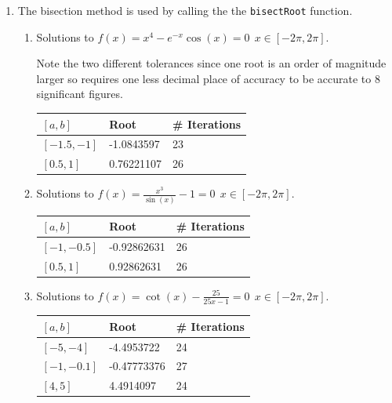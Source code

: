 \documentclass[a4paper,11pt]{article}
\begin{document}
\begin{enumerate}
	\item The bisection method is used by calling the the \verb*|bisectRoot| 
	function.
	
	
	
	\begin{enumerate}
		\item Solutions to $f(x) = x^{4} - e^{-x} \cos(x) = 0 \  \ 
		x\in[-2\pi,2\pi]$.
		
		Note the two different tolerances since one root is an order of 
		magnitude larger so requires one less decimal place of accuracy to be 
		accurate to 8 significant figures.
		\begin{center}
			\begin{tabular}{l|ll}
				$[a,b]$     & Root       & \# Iterations \\ \hline
				$[-1.5,-1]$ & -1.0843597 & 23           \\
				$[0.5,1]$   & 0.76221107 & 26          
			\end{tabular}
		\end{center}
		
	
	
		\item Solutions to $f(x) = \frac{x^{3}}{\sin(x)} - 1 = 0 \  \ 
		x\in[-2\pi,2\pi]$.
		
		\begin{center}
			\begin{tabular}{l|ll}
				$[a,b]$     & Root        & \# Iterations \\ \hline
				$[-1,-0.5]$ & -0.92862631 & 26            \\
				$[0.5,1]$   & 0.92862631  & 26           
			\end{tabular}
		\end{center}
	
	
		\item Solutions to $f(x) = \cot(x)	- \frac{25}{25x-1} = 0 \  \ 
		x\in[-2\pi,2\pi]$.
		
		\begin{center}
			\begin{tabular}{l|ll}
				$[a,b]$     & Root        & \# Iterations \\ \hline
				$[-5,-4]$   & -4.4953722  & 24            \\
				$[-1,-0.1]$ & -0.47773376 & 27            \\
				$[4,5]$     & 4.4914097   & 24           
			\end{tabular}
		\end{center}
		

\end{enumerate}
\end{enumerate}
\end{document}
